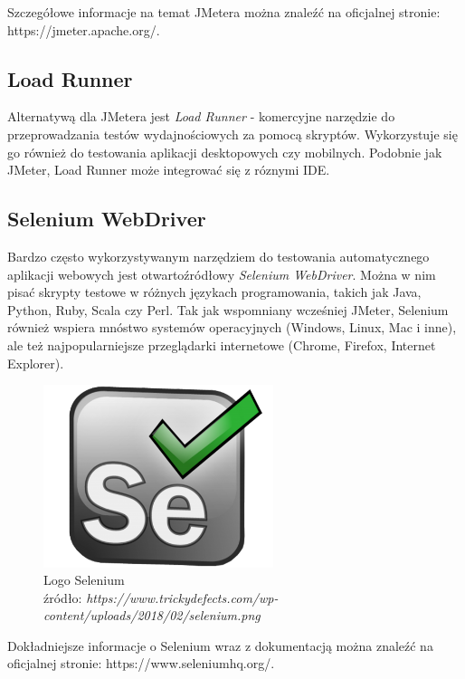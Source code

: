Szczegółowe informacje na temat JMetera można znaleźć na oficjalnej stronie: https://jmeter.apache.org/. 


\subsection{Load Runner}

Alternatywą dla JMetera jest \textit{Load Runner} - komercyjne narzędzie do przeprowadzania testów wydajnościowych za pomocą skryptów. Wykorzystuje się go również do testowania aplikacji desktopowych czy mobilnych. Podobnie jak JMeter, Load Runner może integrować się z róznymi IDE. \cite{lr}

\subsection{Selenium WebDriver} 
Bardzo często wykorzystywanym narzędziem do testowania automatycznego aplikacji webowych jest otwartoźródłowy \textit{Selenium WebDriver}. \cite{aut} Można w nim pisać skrypty testowe w różnych językach programowania, takich jak Java, Python, Ruby, Scala czy Perl. Tak jak wspomniany wcześniej JMeter, Selenium również wspiera mnóstwo systemów operacyjnych (Windows, Linux, Mac i inne), ale też  najpopularniejsze przeglądarki internetowe (Chrome, Firefox, Internet Explorer). \cite{selenium}


\begin{figure}[H]
\centering
\captionsetup{justification=centering}
\includegraphics[width=0.6\textwidth]{selenium.png}
\caption[Logo Selenium]{\label{fig:ham}Logo Selenium \\ źródło: \textit{https://www.trickydefects.com/wp-content/uploads/2018/02/selenium.png}}
\end{figure}

Dokładniejsze informacje o Selenium wraz z dokumentacją można znaleźć na oficjalnej stronie: https://www.seleniumhq.org/.

